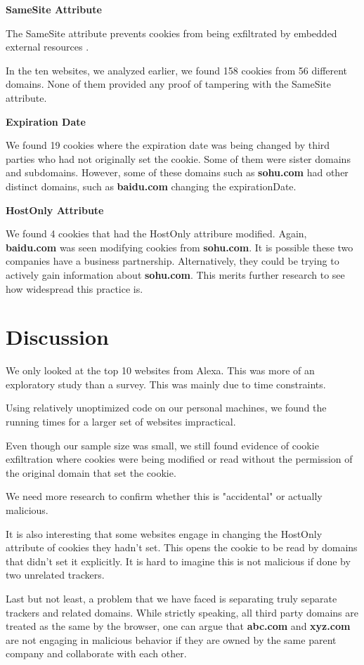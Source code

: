 \documentclass[sigplan,screen]{acmart}
\begin{document}
\textbf{SameSite Attribute}

The SameSite attribute prevents cookies from being exfiltrated by embedded external resources \cite{sameSite}. 

In the ten websites, we analyzed earlier, we found 158 cookies from 56 different domains. None of them provided any proof of tampering with the SameSite attribute.

\textbf{Expiration Date}

We found 19 cookies where the expiration date was being changed by third parties who had not originally set the cookie. Some of them were sister domains and subdomains. 
However, some of these domains such as \textbf{sohu.com} had other distinct domains, such as \textbf{baidu.com} changing the expirationDate. 

\textbf{HostOnly Attribute}

We found 4 cookies that had the HostOnly attribure modified. Again, \textbf{baidu.com} was seen modifying cookies from \textbf{sohu.com}. It is possible these two companies have a business partnership. Alternatively, they could be trying to actively gain information about \textbf{sohu.com}. This merits further research to see how widespread this practice is.


\section{Discussion}
We only looked at the top 10 websites from Alexa. This was more of an exploratory study than a survey. This was mainly due to time constraints. 

Using relatively unoptimized code on our personal machines, we found the running times for a larger set of websites impractical.

Even though our sample size was small, we still found evidence of cookie exfiltration where cookies were being modified or read without the permission of the original domain that set the cookie.

We need more research to confirm whether this is "accidental" or actually malicious. 

It is also interesting that some websites engage in changing the HostOnly attribute of cookies they hadn't set. This opens the cookie to be read by domains that didn't set it explicitly. It is hard to imagine this is not malicious if done by two unrelated trackers.

Last but not least, a problem that we have faced is separating truly separate trackers and related domains. While strictly speaking, all third party domains are treated as the same by the browser, one can argue that \textbf{abc.com} and \textbf{xyz.com} are not engaging in malicious behavior if they are owned by the same parent company and collaborate with each other. 
\end{document}
